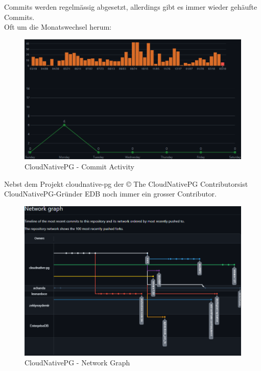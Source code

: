 \begin{flushleft}
    Commits werden regelmässig abgesetzt, allerdings gibt es immer wieder gehäufte Commits.\\
    Oft um die Monatswechsel herum:
    \begin{figure}[H]
        \centering
        \includegraphics[width=0.75\linewidth]{source/implementation/evaluation/postgresql_ha_solutions/insights/cloudnativepg/commit_activity_cloudnative-pg_cloudnative-pg}
        \caption{CloudNativePG - Commit Activity}
        \label{fig:commit_activity_cloudnative-pg_cloudnative-pg}
    \end{figure}

    Nebst dem Projekt cloudnative-pg der \guillemotleft© The CloudNativePG Contributors\guillemotright ist CloudNativePG-Gründer EDB noch immer ein grosser Contributor.
     \begin{figure}[H]
        \centering
        \includegraphics[width=0.75\linewidth]{source/implementation/evaluation/postgresql_ha_solutions/insights/cloudnativepg/network_graph_cloudnative-pg_cloudnative-pg}
        \caption{CloudNativePG - Network Graph}
        \label{fig:network_graph_cloudnative-pg_cloudnative-pg}
    \end{figure}
\end{flushleft}